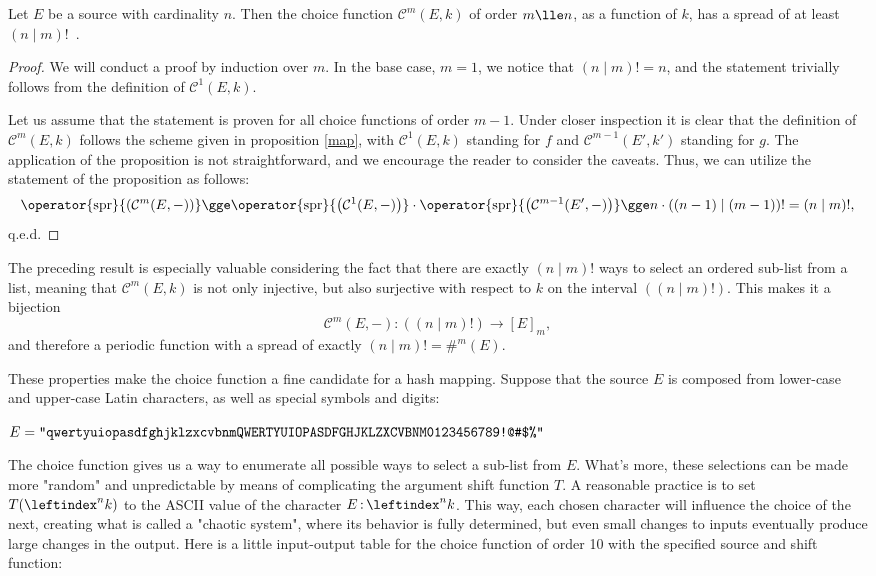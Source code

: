 \documentclass[12pt, a4paper]{article}
\renewcommand{\C}{\mathcal{C}}
\newcommand{\spr}[1]{\operator{\mathrm{spr}}{\left(#1\right)}}
\newcommand{\lui}[1]{\leftindex^{#1}}
\newcommand{\elt}{\mathop{:}}
\begin{document}
\begin{proposition}
    Let $ E $ be a source with cardinality $ n $. Then the choice function $ \C^m(E, k) $ of order $ m \lle n $, as a function of $ k $, has a spread of at least $ (n \mid m)! $\ .
\end{proposition}
\begin{proof}
    We will conduct a proof by induction over $ m $. In the base case, $ m = 1 $, we notice that $ (n \mid m)! = n $, and the statement trivially follows from the definition of $ \C^1(E, k) $.

    Let us assume that the statement is proven for all choice functions of order $ m - 1 $. Under closer inspection it is clear that the definition of $ \C^m(E, k) $ follows the scheme given in proposition \ref{map}, with $ \C^1(E, k) $ standing for $ f $ and $ \C^{m-1}(E', k') $ standing for $ g $. The application of the proposition is not straightforward, and we encourage the reader to consider the caveats. Thus, we can utilize the statement of the proposition as follows:
    \[ \spr{\C^m(E, -)} \gge \spr{\C^1(E, -)} \cdot \spr{\C^{m-1}(E', -)} \gge n \cdot ((n-1) \mid (m-1))! = (n \mid m)!, \]
    q.e.d.
\end{proof}

The preceding result is especially valuable considering the fact that there are exactly $ (n \mid m)! $ ways to select an ordered sub-list from a list, meaning that $ \C^m(E, k) $ is not only injective, but also surjective with respect to $ k $ on the interval $ ((n \mid m)!) $. This makes it a bijection
\[ \C^m(E, -) \colon ((n \mid m)!) \to [E]_m, \]
and therefore a periodic function with a spread of exactly $ (n \mid m)! = \#^m(E) $.

These properties make the choice function a fine candidate for a hash mapping. Suppose that the source $ E $ is composed from lower-case and upper-case Latin characters, as well as special symbols and digits:

\begin{center}
    $ E = \mbox{\texttt{"qwertyuiopasdfghjklzxcvbnmQWERTYUIOPASDFGHJKLZXCVBNM0123456789!@\#\$\%"}} $
\end{center}

The choice function gives us a way to enumerate all possible ways to select a sub-list from $ E $. What's more, these selections can be made more "random" and unpredictable by means of complicating the argument shift function $ T $. A reasonable practice is to set $ T(\lui{n}k) $ to the ASCII value of the character $ E \elt \lui{n}k $. This way, each chosen character will influence the choice of the next, creating what is called a "chaotic system", where its behavior is fully determined, but even small changes to inputs eventually produce large changes in the output. Here is a little input-output table for the choice function of order 10 with the specified source and shift function:
\end{document}
